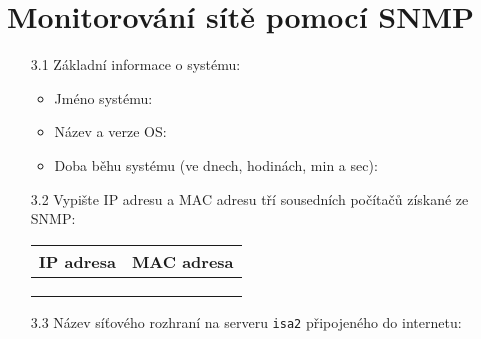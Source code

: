 \documentclass[a4paper,11pt]{article}
\begin{document}
\section{Monitorování sítě pomocí SNMP}
\begin{itemize}
    \item [3.1] Základní informace o systému:
    \begin{itemize}
        \item Jméno systému:
         \vspace{3mm}
        \item Název a verze OS:
         \vspace{3mm}
        \item Doba běhu systému (ve dnech, hodinách, min a sec):
         \vspace{3mm}
    \end{itemize}
    \item [3.2] Vypište IP adresu a MAC adresu tří sousedních počítačů získané ze SNMP:
    
\begin{tabular}{|p{5cm}|p{7cm}|}
\hline
IP adresa  & MAC adresa   \\ \hline
      &     \\   \hline
      &     \\   \hline
      &     \\   \hline
\end{tabular}
    \item[3.3] Název síťového rozhraní na serveru {\tt isa2} připojeného do internetu: 
\end{itemize}
\end{document}
